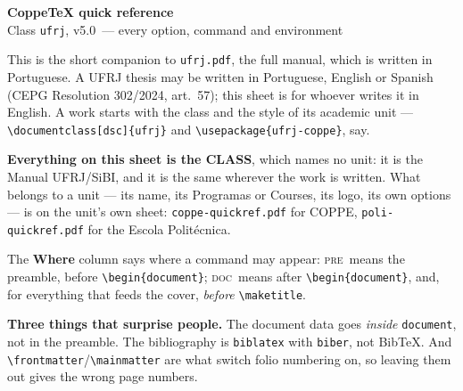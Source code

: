 \documentclass[a4paper,10pt]{article}
\newcommand\ufrjversion{v5.0}
\newcommand\pre{\textsc{pre}}
\newcommand\doc{\textsc{doc}}
\begin{document}
\begin{center}
  {\Large\bfseries CoppeTeX quick reference}\\[2pt]
  {\normalsize Class \texttt{ufrj}, \ufrjversion\ --- every option, command and
  environment}\\[6pt]
  \begin{minipage}{0.86\textwidth}\small
  This is the short companion to \texttt{ufrj.pdf}, the full manual, which is
  written in Portuguese. A UFRJ thesis may be written in Portuguese, English or
  Spanish (CEPG Resolution 302/2024, art.~57); this sheet is for whoever writes
  it in English. A work starts with the class and the style of its academic
  unit --- \verb|\documentclass[dsc]{ufrj}| and \verb|\usepackage{ufrj-coppe}|,
  say.

  \medskip
  \textbf{Everything on this sheet is the CLASS}, which names no unit: it is
  the Manual UFRJ/SiBI, and it is the same wherever the work is written. What
  belongs to a unit --- its name, its Programas or Courses, its logo, its own
  options --- is on the unit's own sheet: \texttt{coppe-quickref.pdf} for
  COPPE, \texttt{poli-quickref.pdf} for the Escola Politécnica.

  \medskip
  The \textbf{Where} column says where a command may appear:
  \pre\ means the preamble, before \verb|\begin{document}|;
  \doc\ means after \verb|\begin{document}|, and, for everything that feeds the
  cover, \emph{before} \verb|\maketitle|.

  \medskip
  \textbf{Three things that surprise people.} The document data goes
  \emph{inside} \texttt{document}, not in the preamble. The bibliography is
  \texttt{biblatex} with \texttt{biber}, not Bib\TeX. And
  \verb|\frontmatter|/\verb|\mainmatter| are what switch folio numbering on, so
  leaving them out gives the wrong page numbers.
  \end{minipage}
\end{center}

\vspace{4pt}
\end{document}
